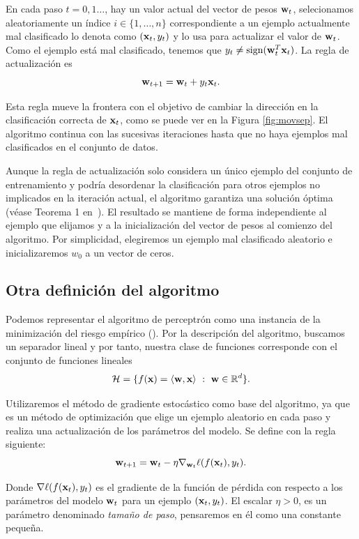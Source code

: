 \documentclass[oneside,openright,titlepage,numbers=noenddot,openany,headinclude,footinclude=true,
cleardoublepage=empty,abstractoff,BCOR=5mm,paper=a4,fontsize=12pt,main=spanish]{scrreprt}
\begin{document}
En cada paso $t=0,1\dots$, hay un valor actual del vector de pesos $\textbf{w}_t$, selecionamos aleatoriamente un índice $i\in \{1,\dots,n\}$ correspondiente a un ejemplo actualmente mal clasificado lo denota como $(\textbf{x}_t,y_t)$ y lo usa para actualizar el valor de $\textbf{w}_t$. Como el ejemplo está mal clasificado, tenemos que $y_t\neq \text{sign}(\textbf{w}^T_t\textbf{x}_t)$. La regla de actualización es $$\textbf{w}_{t+1}=\textbf{w}_t+y_t\textbf{x}_t.$$

Esta regla mueve la frontera con el objetivo de cambiar la dirección en la clasificación correcta de $\textbf{x}_t$, como se puede ver en la Figura \ref{fig:movsep}. El algoritmo continua con las sucesivas iteraciones hasta que no haya ejemplos mal clasificados en el conjunto de datos.

Aunque la regla de actualización solo considera un único ejemplo del conjunto de entrenamiento y podría desordenar la clasificación para otros ejemplos no implicados en la iteración actual, el algoritmo garantiza una solución óptima (véase Teorema 1 en~\cite{perceptronproof2012}). El resultado se mantiene de forma independiente al ejemplo que elijamos y a la inicialización del vector de pesos al comienzo del algoritmo. Por simplicidad, elegiremos un ejemplo mal clasificado aleatorio e inicializaremos $w_0$ a un vector de ceros.

\subsection*{Otra definición del algoritmo}

Podemos representar el algoritmo de perceptrón como una instancia de la minimización del riesgo empírico (\cite{fairnesslearning2019}). Por la descripción del algoritmo, buscamos un separador lineal y por tanto, nuestra clase de funciones corresponde con el conjunto de funciones lineales $$\mathcal H = \{ f(\textbf{x}) = \langle \textbf{w},\textbf{x} \rangle \ : \ \textbf{w} \in \mathbb R^d \}.$$

Utilizaremos el método de gradiente estocástico como base del algoritmo, ya que es un método de optimización que elige un ejemplo aleatorio en cada paso y realiza una actualización de los parámetros del modelo. Se define con la regla siguiente: $$\textbf{w}_{t+1}=\textbf{w}_t-\eta \nabla_{\textbf{w}_t} \ell (f(\textbf{x}_t),y_t).$$

Donde $\nabla \ell (f(\textbf{x}_t),y_t)$ es el gradiente de la función de pérdida con respecto a los parámetros del modelo $\textbf{w}_t$ para un ejemplo $(\textbf{x}_t,y_t)$. El escalar $\eta > 0$, es un parámetro denominado \textit{tamaño de paso}, pensaremos en él como una constante pequeña.
\end{document}
